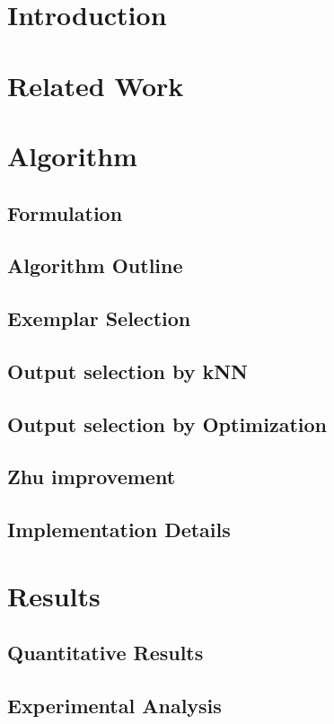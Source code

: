 \section{Introduction}


\section{Related Work}


\section{Algorithm}


\subsection{Formulation}


\subsection{Algorithm Outline}


\subsection{Exemplar Selection}


\subsection{Output selection by kNN}


\subsection{Output selection by Optimization}


\subsection{Zhu \etal improvement}


\subsection{Implementation Details}


\section{Results}


\subsection{Quantitative Results}


\subsection{Experimental Analysis}

